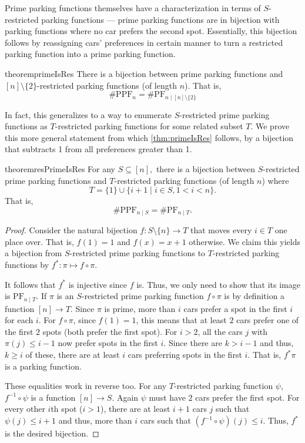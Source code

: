 \documentclass[12 pt]{amsart}
\theoremstyle{definition} %
\theoremstyle{remark} %
\begin{document}
Prime parking functions themselves have a characterization in terms of $S$-restricted parking functions --- prime parking functions are in bijection with parking functions where no car prefers the second spot. Essentially, this bijection follows by reassigning cars' preferences in certain manner to turn a restricted parking function into a prime parking function.

\begin{restatable}{theorem}{primeIsRes}
    \label{thm:primeIsRes}
	There is a bijection between prime parking functions and $[n] \setminus \{ 2 \}$-restricted parking functions (of length $n$). That is,
	\[
		\# \mathrm{PPF}_{n} = \# \mathrm{PF}_{n \mid [n] \setminus \{ 2 \}} 
	\]
\end{restatable}

In fact, this generalizes to a way to enumerate $S$-restricted prime parking functions as $T$-restricted parking functions for some related subset $T$. We prove this more general statement from which \cref{thm:primeIsRes} follows, by a bijection that subtracts 1 from all preferences greater than 1. 

\begin{restatable}{theorem}{resPrimeIsRes}
	For any $S\subseteq [n],$  there is a bijection between $S$-restricted prime parking functions and $T$-restricted parking functions (of length $n$) where
	\[
		T = \{ 1 \} \cup \{ i + 1 \mid i \in S, 1 < i < n \}.
	\]
	That is,
	\[
		\# \mathrm{PPF}_{n \mid S} = \# \mathrm{PF}_{n \mid T}.
	\]
\end{restatable}

\begin{proof}
	Consider the natural bijection $f : S \setminus \{ n \} \to T$ that moves every $i \in T$ one place over. That is, $f(1) = 1$ and $f(x) = x + 1$ otherwise. We claim this yields a bijection from $S$-restricted prime parking functions to $T$-restricted parking functions by $f^{*} : \pi \mapsto f \circ \pi$.

	It follows that $f^{*}$ is injective since $f$ is. Thus, we only need to show that its image is $\mathrm{PF}_{n \mid T}$. If $\pi$ is an $S$-restricted prime parking function $f \circ \pi$ is by definition a function $[n] \to T$. Since $\pi$ is prime, more than $i$ cars prefer a spot in the first $i$ for each $i$. For $f \circ \pi$, since $f(1) = 1$, this means that at least $2$ cars prefer one of the first $2$ spots (both prefer the first spot). For $i > 2$, all the cars $j$ with $\pi(j) \le i - 1$ now prefer spots in the first $i$. Since there are $k > i - 1$ and thus, $k \ge i$ of these, there are at least $i$ cars preferring spots in the first $i$. That is, $f^{*} \pi$ is a parking function.

	These equalities work in reverse too. For any $T$-restricted parking function $\psi$, $f^{-1} \circ \psi$ is a function $[n] \to S$. Again $\psi$ must have $2$ cars prefer the first spot. For every other $i$th spot ($i > 1$), there are at least $i + 1$ cars $j$ such that $\psi(j) \le i + 1$ and thus, more than $i$ cars such that $(f^{-1} \circ \psi)(j) \le i$. Thus, $f^{*}$ is the desired bijection.
\end{proof}
\end{document}
